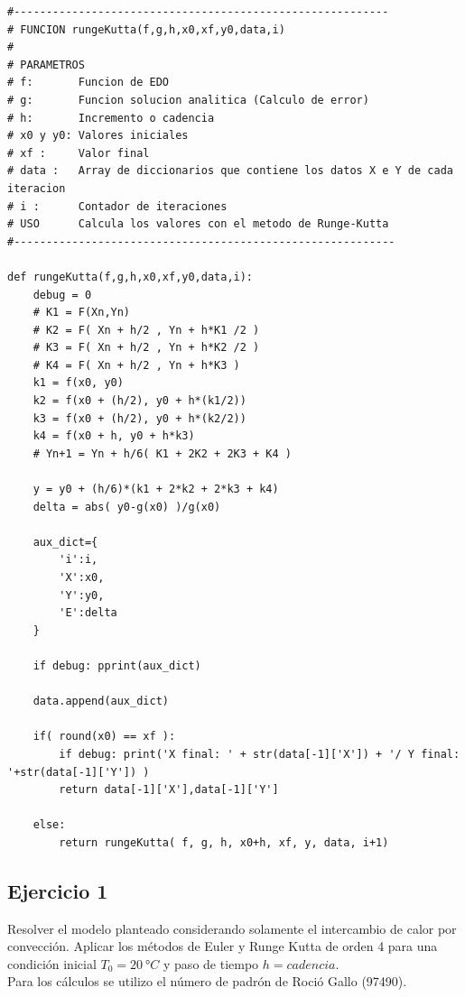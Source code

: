 \documentclass[10pt,a4paper]{article}
\newcommand\NP{97490}
\begin{document}
\begin{verbatim}
#----------------------------------------------------------
# FUNCION rungeKutta(f,g,h,x0,xf,y0,data,i)
#
# PARAMETROS
# f:       Funcion de EDO
# g:       Funcion solucion analitica (Calculo de error)
# h:       Incremento o cadencia
# x0 y y0: Valores iniciales
# xf :     Valor final
# data :   Array de diccionarios que contiene los datos X e Y de cada iteracion
# i :      Contador de iteraciones 
# USO      Calcula los valores con el metodo de Runge-Kutta
#-----------------------------------------------------------

def rungeKutta(f,g,h,x0,xf,y0,data,i):
    debug = 0
    # K1 = F(Xn,Yn)
    # K2 = F( Xn + h/2 , Yn + h*K1 /2 )
    # K3 = F( Xn + h/2 , Yn + h*K2 /2 )
    # K4 = F( Xn + h/2 , Yn + h*K3 )
    k1 = f(x0, y0)
    k2 = f(x0 + (h/2), y0 + h*(k1/2))
    k3 = f(x0 + (h/2), y0 + h*(k2/2))
    k4 = f(x0 + h, y0 + h*k3)
    # Yn+1 = Yn + h/6( K1 + 2K2 + 2K3 + K4 )
    
    y = y0 + (h/6)*(k1 + 2*k2 + 2*k3 + k4)
    delta = abs( y0-g(x0) )/g(x0)

    aux_dict={
        'i':i,
        'X':x0,
        'Y':y0,
        'E':delta
    }

    if debug: pprint(aux_dict)

    data.append(aux_dict)

    if( round(x0) == xf ):
        if debug: print('X final: ' + str(data[-1]['X']) + '/ Y final: '+str(data[-1]['Y']) ) 
        return data[-1]['X'],data[-1]['Y']

    else:
        return rungeKutta( f, g, h, x0+h, xf, y, data, i+1)
\end{verbatim}


\subsection{Ejercicio 1}
Resolver el modelo planteado considerando solamente el intercambio de calor por convección. Aplicar los métodos de Euler y Runge Kutta de orden 4 para una condición inicial
$T_{0}=\SI{20}{\degree C}$ y paso de tiempo $h = cadencia$. \\
Para los cálculos se utilizo el número de padrón de Roció Gallo (\NP).
\end{document}
